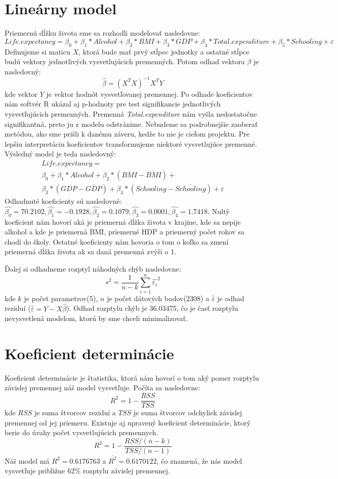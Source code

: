 \section*{Lineárny model}
Priemernú dĺžku života sme sa rozhodli modelovať nasledovne:
\[
    Life.expectancy = \beta_0 + \beta_1*Alcohol + \beta_2*BMI + \beta_3*GDP + \beta_4*Total.expenditure + \beta_5*Schooling + \varepsilon
\]  
Definujeme si maticu $X$, ktorá bude mať prvý stĺpec jednotky a ostatné stĺpce budú vektory jednotlivých
vysvetlujúcich premenných. Potom odhad vektora $\beta$ je nasledovný:
\[
    \hat{\beta} = (X^TX)^{-1}X^TY  
\]
kde vektor $Y$ je vektor hodnôt vysvetľovanej premennej. Po odhade koeficientov nám softvér R ukázal aj p-hodnoty pre test signifikancie jednotlivých vysvetľujúcich premenných.
Premenná \textit{Total.expenditure} nám vyšla nedostatočne signifikantná, preto ju z modelu odstránime. Nebudeme sa podrobnejšie zaoberať metódou, ako sme prišli k danému záveru, kedže to nie je cieľom projektu.
Pre lepšiu interpretáciu koeficientov transformujeme niektoré vysvetlujúce premenné. Výsledný model je teda nasledovný:
\[
    \begin{array}{c}
    Life.expectancy = \\
    \beta_0 + \beta_1*Alcohol + \beta_2*(BMI-\overline{BMI}) + \\
    \beta_3*(GDP-\overline{GDP}) + \beta_4*(Schooling-\overline{Schooling}) + \varepsilon
    \end{array}
\]
Odhadnuté koeficienty sú nasledovné: $\hat{\beta_0}=70.2102, \hat{\beta_1}= -0.1928, \hat{\beta_2}=0.1079,  \hat{\beta_3}=0.0001, \hat{\beta_4}=1.7418$. Nultý koeficient nám hovorí
aká je priemerná dĺžka života v krajine, kde sa nepije alkohol a kde je priemerná BMI, priemerné HDP a priemerný počet rokov sa chodí do školy. Ostatné koeficienty nám hovoria o tom o koľko sa zmení priemerná dĺžka života ak sa daná premenná zvýši o 1.

Ďalej si odhadneme rozptyl náhodných chýb nasledovne:
\[
    s^2  = \frac{1}{n-k}\sum_{i=1}^{n}{\hat{\varepsilon_i}^2}
\]
kde $k$ je počet parametrov(5), $n$ je počet dátových bodov(2308) a $\hat{\varepsilon}$ je odhad reziduí ($\hat{\varepsilon} = Y - X\hat{\beta}$). 
Odhad rozptylu chýb je 36.03475, čo je časť rozptylu nevysvetlená modelom, ktorú by sme chceli minimalizovať.

\section*{Koeficient determinácie}
Koeficient determinácie je štatistika, ktorá nám hovorí o tom aký pomer rozptylu závislej premennej náš model vysvetľuje.
Počíta sa nasledovne:
\[
    R^2 = 1 - \frac{RSS}{TSS}  
\]
kde $RSS$ je suma štvorcov reziduí a $TSS$ je suma štvorcov odchyliek závislej premennej od jej priemeru.
Existuje aj upravený koeficient determinácie, ktorý berie do úvahy počet vysvetlujúcich premennych.
\[
  \overline{R^2} = 1 - \frac{RSS/(n-k)}{TSS/(n-1)}  
\]
Náš model má $R^2 = 0.6176763$ a $\overline{R^2} = 0.6170122$, čo znamená, že nás model vysvetľuje približne 62\% rozptylu závislej premennej.

